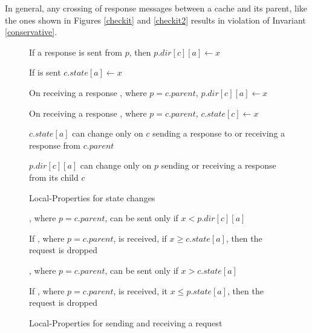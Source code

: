 In general, any crossing of response messages between a cache and its parent,
like the ones shown in Figures \ref{checkit} and \ref{checkit2} results in
violation of Invariant \ref{conservative}.

\begin{figure}\small
\begin{inv}
If a response  is sent from $p$, then $p.dir[c][a] \gets x$\label{cSendRespPost}
\end{inv}
\begin{inv}
If  is sent $c.state[a] \gets x$\label{pSendRespPost}
\end{inv}
\begin{inv}
On receiving a response , where $p = c.parent$, $p.dir[c][a]
\gets x$\label{pRecvResp}
\end{inv}
\begin{inv}
On receiving a response , where $p = c.parent$, $c.state[c]
\gets x$\label{cRecvResp}
\end{inv}
\begin{inv}
$c.state[a]$ can change only on $c$ sending a response to or receiving a
response from $c.parent$\label{cState}
\end{inv}
\begin{inv}
$p.dir[c][a]$ can change only on $p$ sending or receiving a response from
its child $c$\label{pState}
\end{inv}
\caption{Local-Properties for state changes}
\label{stateChange}
\end{figure}

\begin{figure}\small
\begin{inv}
, where $p = c.parent$, can be sent only if $x < p.dir[c][a]$\label{pSendReqPre}
\end{inv}
\begin{inv}
If , where $p = c.parent$, is received, if $x \ge c.state[a]$,
then the request is dropped\label{pSendReqPost}
\end{inv}
\begin{inv}
, where $p = c.parent$, can be sent only if $x > c.state[a]$\label{cSendReqPre}
\end{inv}
\begin{inv}
If , where $p = c.parent$, is received, it $x \le p.state[a]$,
then the request is dropped\label{cSendReqPost}
\end{inv}
\caption{Local-Properties for sending and receiving a request}
\label{sendReq}
\end{figure}

